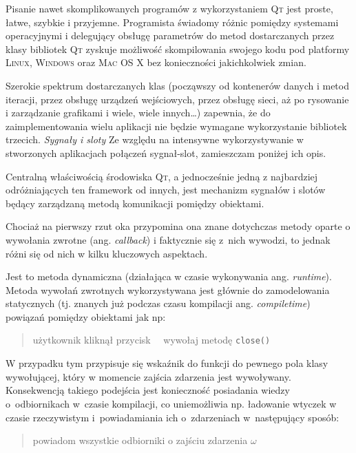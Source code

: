 Pisanie nawet skomplikowanych programów z wykorzystaniem \textsc{Qt} jest proste, łatwe, szybkie i przyjemne.
Programista świadomy różnic pomiędzy systemami operacyjnymi i delegujący obsługę parametrów do metod dostarczanych przez klasy bibliotek \textsc{Qt} zyskuje możliwość skompilowania swojego kodu pod platformy \textsc{Linux}, \textsc{Windows} oraz \textsc{Mac OS X} bez konieczności jakichkolwiek zmian.

Szerokie spektrum dostarczanych klas (począwszy od kontenerów danych i metod iteracji, przez obsługę urządzeń wejściowych, przez obsługę sieci, aż po rysowanie i zarządzanie grafikami i wiele, wiele innych\ldots) zapewnia, że do zaimplementowania wielu aplikacji nie będzie wymagane wykorzystanie bibliotek trzecich.
\newline
\newline
\textsl{Sygnały i sloty}
Ze względu na intensywne wykorzystywanie w stworzonych aplikacjach połączeń sygnał-slot, zamieszczam poniżej ich opis.

Centralną właściwością środowiska \textsc{Qt}, a jednocześnie jedną z najbardziej odróżniających ten framework od innych, jest mechanizm sygnałów i slotów będący zarządzaną metodą komunikacji pomiędzy obiektami.

Chociaż na pierwszy rzut oka przypomina ona znane dotychczas metody oparte o wywołania zwrotne (ang. \textsl{callback}) i faktycznie się z~nich wywodzi, to jednak różni się od nich w kilku kluczowych aspektach.

Jest to metoda dynamiczna (działająca w czasie wykonywania \ppauza ang. \textsl{runtime}).
Metoda wywołań zwrotnych wykorzystywana jest głównie do zamodelowania statycznych (tj. znanych już podczas czasu kompilacji \ppauza ang. \textsl{compiletime}) powiązań pomiędzy obiektami jak np:
\begin{verse}
użytkownik kliknął przycisk \texttimes~\textrightarrow~wywołaj metodę \texttt{close()}
\end{verse}

W przypadku tym przypisuje się wskaźnik do funkcji do pewnego pola klasy wywołującej, który w momencie zajścia zdarzenia jest wywoływany.
Konsekwencją takiego podejścia jest konieczność posiadania wiedzy o~odbiornikach w~czasie kompilacji, co uniemożliwia np. ładowanie wtyczek w czasie rzeczywistym i~powiadamiania ich o~zdarzeniach w~następujący sposób:
\begin{verse}
powiadom wszystkie odbiorniki o zajściu zdarzenia $\omega$
\end{verse}

